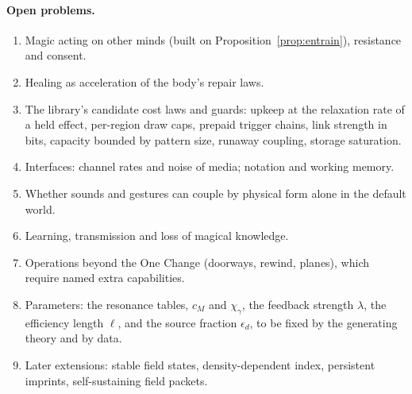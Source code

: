 \documentclass[11pt,a4paper]{article}
\numberwithin{equation}{section}
\theoremstyle{definition}
\theoremstyle{plain}
\theoremstyle{remark}
\newcommand{\cM}{c_{M}}
\begin{document}
\paragraph{Open problems.}
\begin{enumerate}
\item Magic acting on other minds (built on Proposition~\ref{prop:entrain}), resistance and consent.
\item Healing as acceleration of the body's repair laws.
\item The library's candidate cost laws and guards: upkeep at the relaxation rate of a held effect, per-region draw caps, prepaid trigger chains, link strength in bits, capacity bounded by pattern size, runaway coupling, storage saturation.
\item Interfaces: channel rates and noise of media; notation and working memory.
\item Whether sounds and gestures can couple by physical form alone in the default world.
\item Learning, transmission and loss of magical knowledge.
\item Operations beyond the One Change (doorways, rewind, planes), which require named extra capabilities.
\item Parameters: the resonance tables, $\cM$ and $\chi_\gamma$, the feedback strength $\lambda$, the efficiency length $\ell$, and the source fraction $\epsilon_d$, to be fixed by the generating theory and by data.
\item Later extensions: stable field states, density-dependent index, persistent imprints, self-sustaining field packets.
\end{enumerate}
\end{document}
